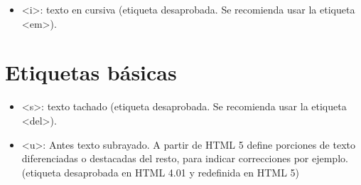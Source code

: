 \documentclass[11pt]{article}
\begin{document}
\begin{itemize}
\item <i>: texto en cursiva (etiqueta desaprobada. Se recomienda usar la etiqueta <em>).
\end{itemize}

\section*{Etiquetas básicas}
\label{sec:orgheadline7}

\begin{itemize}
\item <s>: texto tachado (etiqueta desaprobada. Se recomienda usar la etiqueta <del>).

\item <u>: Antes texto subrayado. A partir de HTML 5 define porciones de texto
diferenciadas o destacadas del resto, para indicar correcciones por
ejemplo. (etiqueta desaprobada en HTML 4.01 y redefinida en HTML 5)
\end{itemize}
\end{document}
